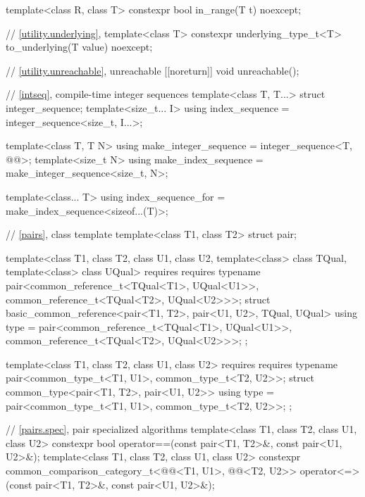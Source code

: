 \begin{codeblock}
{  template<class R, class T>
    constexpr bool in_range(T t) noexcept;

  // \ref{utility.underlying}, 
  template<class T>
    constexpr underlying_type_t<T> to_underlying(T value) noexcept;

  // \ref{utility.unreachable}, unreachable
  [[noreturn]] void unreachable();

  // \ref{intseq}, compile-time integer sequences%
%
%
  template<class T, T...>
    struct integer_sequence;
  template<size_t... I>
    using index_sequence = integer_sequence<size_t, I...>;

  template<class T, T N>
    using make_integer_sequence = integer_sequence<T, @\seebelow{}@>;
  template<size_t N>
    using make_index_sequence = make_integer_sequence<size_t, N>;

  template<class... T>
    using index_sequence_for = make_index_sequence<sizeof...(T)>;

  // \ref{pairs}, class template 
  template<class T1, class T2>
    struct pair;

  template<class T1, class T2, class U1, class U2,
           template<class> class TQual, template<class> class UQual>
    requires requires { typename pair<common_reference_t<TQual<T1>, UQual<U1>>,
                                      common_reference_t<TQual<T2>, UQual<U2>>>; }
  struct basic_common_reference<pair<T1, T2>, pair<U1, U2>, TQual, UQual> {
    using type = pair<common_reference_t<TQual<T1>, UQual<U1>>,
                      common_reference_t<TQual<T2>, UQual<U2>>>;
  };

  template<class T1, class T2, class U1, class U2>
    requires requires { typename pair<common_type_t<T1, U1>, common_type_t<T2, U2>>; }
  struct common_type<pair<T1, T2>, pair<U1, U2>> {
    using type = pair<common_type_t<T1, U1>, common_type_t<T2, U2>>;
  };

  // \ref{pairs.spec}, pair specialized algorithms
  template<class T1, class T2, class U1, class U2>
    constexpr bool operator==(const pair<T1, T2>&, const pair<U1, U2>&);
  template<class T1, class T2, class U1, class U2>
    constexpr common_comparison_category_t<@@<T1, U1>,
                                           @@<T2, U2>>
      operator<=>(const pair<T1, T2>&, const pair<U1, U2>&);

}
\end{codeblock}
